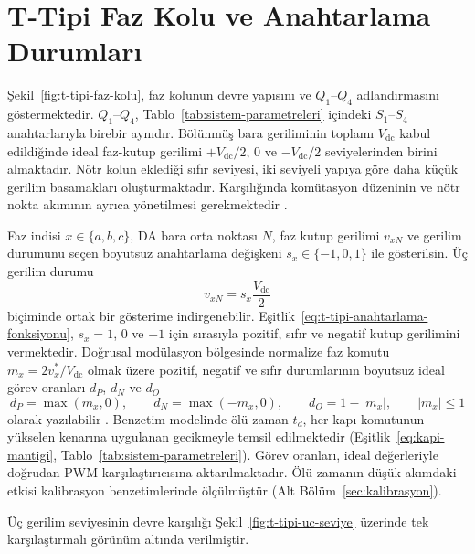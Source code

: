 \section{T-Tipi Faz Kolu ve Anahtarlama Durumları}

Şekil~\ref{fig:t-tipi-faz-kolu}, faz kolunun devre yapısını ve $Q_1$--$Q_4$ adlandırmasını göstermektedir. $Q_1$--$Q_4$, Tablo~\ref{tab:sistem-parametreleri} içindeki $S_1$--$S_4$ anahtarlarıyla birebir aynıdır. Bölünmüş bara geriliminin toplamı $V_{\mathrm{dc}}$ kabul edildiğinde ideal faz-kutup gerilimi $+V_{\mathrm{dc}}/2$, $0$ ve $-V_{\mathrm{dc}}/2$ seviyelerinden birini almaktadır. Nötr kolun eklediği sıfır seviyesi, iki seviyeli yapıya göre daha küçük gerilim basamakları oluşturmaktadır. Karşılığında komütasyon düzeninin ve nötr nokta akımının ayrıca yönetilmesi gerekmektedir \citep{Schweizer2013,Wang2020}.

Faz indisi $x\in\{a,b,c\}$, DA bara orta noktası $N$, faz kutup gerilimi $v_{xN}$ ve gerilim durumunu seçen boyutsuz anahtarlama değişkeni $s_x\in\{-1,0,1\}$ ile gösterilsin. Üç gerilim durumu
\begin{equation}
  v_{xN}=s_x\frac{V_{\mathrm{dc}}}{2}
  \label{eq:t-tipi-anahtarlama-fonksiyonu}
\end{equation}
biçiminde ortak bir gösterime indirgenebilir. Eşitlik~\eqref{eq:t-tipi-anahtarlama-fonksiyonu}, $s_x=1$, $0$ ve $-1$ için sırasıyla pozitif, sıfır ve negatif kutup gerilimini vermektedir. Doğrusal modülasyon bölgesinde normalize faz komutu $m_x=2v_x^{\ast}/V_{\mathrm{dc}}$ olmak üzere pozitif, negatif ve sıfır durumlarının boyutsuz ideal görev oranları $d_P$, $d_N$ ve $d_O$
\begin{equation}
  d_P=\max(m_x,0),\qquad
  d_N=\max(-m_x,0),\qquad
  d_O=1-|m_x|,\qquad |m_x|\leq 1
  \label{eq:t-tipi-gorev-oranlari}
\end{equation}
olarak yazılabilir \citep{Holmes2003,Wang2020}. Benzetim modelinde ölü zaman $t_d$, her kapı komutunun yükselen kenarına uygulanan gecikmeyle temsil edilmektedir (Eşitlik~\eqref{eq:kapi-mantigi}, Tablo~\ref{tab:sistem-parametreleri}). Görev oranları, ideal değerleriyle doğrudan PWM karşılaştırıcısına aktarılmaktadır. Ölü zamanın düşük akımdaki etkisi kalibrasyon benzetimlerinde ölçülmüştür (Alt Bölüm~\ref{sec:kalibrasyon}).

Üç gerilim seviyesinin devre karşılığı Şekil~\ref{fig:t-tipi-uc-seviye} üzerinde tek karşılaştırmalı görünüm altında verilmiştir.

